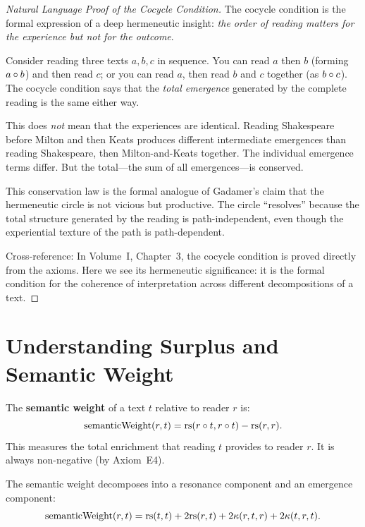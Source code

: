 \begin{proof}[Natural Language Proof of the Cocycle Condition]
The cocycle condition is the formal expression of a deep hermeneutic insight:
\emph{the order of reading matters for the experience but not for the
outcome}.

Consider reading three texts $a, b, c$ in sequence.  You can read $a$ then $b$
(forming $a \circ b$) and then read $c$; or you can read $a$, then read
$b$ and $c$ together (as $b \circ c$).  The cocycle condition says that the
\emph{total emergence} generated by the complete reading is the same either way.

This does \emph{not} mean that the experiences are identical.  Reading
Shakespeare before Milton and then Keats produces different intermediate
emergences than reading Shakespeare, then Milton-and-Keats together.  The
individual emergence terms differ.  But the total---the sum of all
emergences---is conserved.

This conservation law is the formal analogue of Gadamer's claim that the
hermeneutic circle is not vicious but productive.  The circle ``resolves''
because the total structure generated by the reading is path-independent,
even though the experiential texture of the path is path-dependent.

Cross-reference: In Volume~I, Chapter~3, the cocycle condition is proved
directly from the axioms.  Here we see its hermeneutic significance:
it is the formal condition for the coherence of interpretation across
different decompositions of a text.
\end{proof}

\section{Understanding Surplus and Semantic Weight}

\begin{definition}
\label{def:semantic-weight}
The \textbf{semantic weight} of a text $t$ relative to reader $r$ is:
\[
\mathrm{semanticWeight}(r, t) = \mathrm{rs}(r \circ t, r \circ t) - \mathrm{rs}(r, r).
\]
This measures the total enrichment that reading $t$ provides to reader $r$.
It is always non-negative (by Axiom~E4).
\end{definition}

\begin{theorem}
\label{thm:semantic-weight-decomp}
The semantic weight decomposes into a resonance component and an emergence
component:
\[
\mathrm{semanticWeight}(r, t) = \mathrm{rs}(t, t) + 2\mathrm{rs}(r, t) + 2\kappa(r, t, r) + 2\kappa(t, r, t).
\]
\end{theorem}

